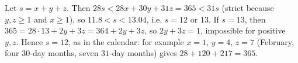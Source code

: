 Let $s=x+y+z$. Then $28s<28x+30y+31z=365<31s$ (strict because $y,z\ge1$ and $x\ge1$), so $11.8<s<13.04$, i.e. $s=12$ or $13$. If $s=13$, then $365=28\cdot13+2y+3z=364+2y+3z$, so $2y+3z=1$, impossible for positive $y,z$. Hence $s=\boxed{12}$, as in the calendar: for example $x=1$, $y=4$, $z=7$ (February, four $30$-day months, seven $31$-day months) gives $28+120+217=365$.
